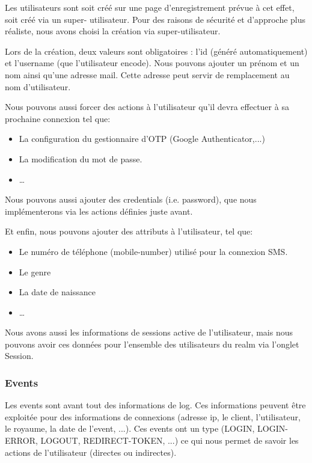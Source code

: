 Les utilisateurs sont soit créé sur une page d'enregistrement prévue à cet effet, soit créé via un super-
utilisateur. Pour des raisons de sécurité et d'approche plus réaliste, nous avons choisi la création via
super-utilisateur.

Lors de la création, deux valeurs sont obligatoires : l'id (généré automatiquement) et l'username (que
l'utilisateur encode). Nous pouvons ajouter un prénom et un nom ainsi qu'une adresse mail. Cette
adresse peut servir de remplacement au nom d'utilisateur.

Nous pouvons aussi forcer des actions à l'utilisateur qu'il devra effectuer à sa prochaine connexion tel
que:

\begin{itemize}
    \item La configuration du gestionnaire d'OTP (Google Authenticator,...)
    \item La modification du mot de passe.
    \item \dots
\end{itemize}

Nous pouvons aussi ajouter des credentials (i.e. password), que nous implémenterons via les actions définies juste
avant.

Et enfin, nous pouvons ajouter des attributs à l'utilisateur, tel que:

\begin{itemize}
    \item Le numéro de téléphone (mobile-number) utilisé pour la connexion SMS.
    \item Le genre
    \item La date de naissance
    \item \dots
\end{itemize}

Nous avons aussi les informations de sessions active de l'utilisateur, mais nous pouvons avoir ces
données pour l'ensemble des utilisateurs du realm via l'onglet Session.

\subsubsection{Events}

Les events sont avant tout des informations de log. Ces informations peuvent être exploitée pour des
informations de connexions (adresse ip, le client, l'utilisateur, le royaume, la date de l'event, ...). Ces
events ont un type (LOGIN, LOGIN-ERROR, LOGOUT, REDIRECT-TOKEN, ...) ce qui nous permet de
savoir les actions de l'utilisateur (directes ou indirectes).

